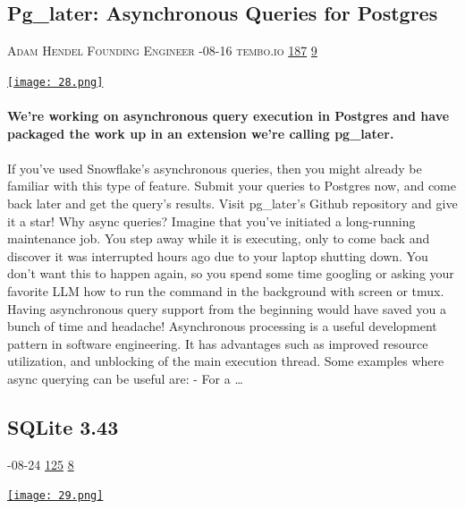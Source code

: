 \documentclass[10pt,a4paper]{article}
\begin{document}
\begin{multicols}{2}
\begin{minipage}{\linewidth}
\subsection{Pg\_later: Asynchronous Queries for Postgres}
\textsc{\footnotesize
{\scriptsize\faUser}\space 
Adam Hendel Founding Engineer 
{\scriptsize\faCalendar}-08-16 
{\scriptsize\faGlobe}\space 
tembo.io 
{\scriptsize\faThumbsOUp}\space 
\href{http://news.ycombinator.com/item?id=37172689\&utm\_term=comment}{187} 
{\scriptsize\faComments}\space 
\href{http://news.ycombinator.com/item?id=37172689\&utm\_term=comment}{9} 
}
\par\medskip\noindent
\href{https://tembo.io/blog/introducing-pg-later/?utm\_source=hackernewsletter\&utm\_medium=email\&utm\_term=data}{
    \texttt{[image: 28.png]}
}
\end{minipage}
\paragraph{}
\textbf{We’re working on asynchronous query execution in Postgres and have packaged the work up in an extension we’re calling pg\_later.}
\paragraph{}
 If you’ve used Snowflake’s asynchronous queries, then you might already be familiar with this type of feature. Submit your queries to Postgres now, and come back later and get the query’s results.
Visit pg\_later’s Github repository and give it a star!
Why async queries?
Imagine that you’ve initiated a long-running maintenance job. You step away while it is executing, only to come back and discover it was interrupted hours ago due to your laptop shutting down. You don’t want this to happen again, so you spend some time googling or asking your favorite LLM how to run the command in the background with screen or tmux. Having asynchronous query support from the beginning would have saved you a bunch of time and headache!
Asynchronous processing is a useful development pattern in software engineering. It has advantages such as improved resource utilization, and unblocking of the main execution thread.
Some examples where async querying can be useful are:
- For a 
\dots\par
\noindent\begin{minipage}{\linewidth}
\medskip
\subsection{SQLite 3.43}
\textsc{\footnotesize
{\scriptsize\faCalendar}-08-24 
{\scriptsize\faThumbsOUp}\space 
\href{http://news.ycombinator.com/item?id=37255022\&utm\_term=comment}{125} 
{\scriptsize\faComments}\space 
\href{http://news.ycombinator.com/item?id=37255022\&utm\_term=comment}{8} 
}
\par\medskip\noindent
\href{https://sqlite.org/releaselog/3\_43\_0.html?utm\_source=hackernewsletter\&utm\_medium=email\&utm\_term=data}{
    \texttt{[image: 29.png]}
}
\end{minipage}

\end{multicols}
\end{document}
